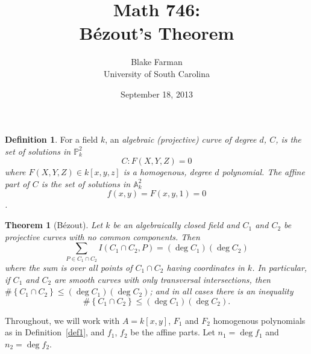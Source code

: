 \documentclass[10pt]{amsart}
\author{Blake Farman\\University of South Carolina}
\title{Math 746:\\B\'{e}zout's Theorem}
\date{September 18, 2013}
\begin{document}
\maketitle

\providecommand{\p}{\mathfrak{p}}
\providecommand{\m}{\mathfrak{m}}

\newtheorem{thm}{Theorem}
\newtheorem{lem}{Lemma}
\newtheorem{prop}{Proposition}
\theoremstyle{definition}
\newtheorem{defn}{Definition}

\newcommand{\A}{\mathbb{A}}

\begin{defn}\label{curve}
  For a field $k$, an \it{algebraic (projective) curve of degree $d$}, $C$, is the set of solutions in $\mathbb{P}^2_k$
  $$C \colon F(X,Y,Z) = 0$$
  where $F(X,Y,Z) \in k[x,y,z]$ is a homogenous, degree $d$ polynomial.
  The \it{affine part} of $C$ is the set of solutions in $\A_k^2$ $$f(x,y) = F(x,y,1) = 0$$.
\end{defn}


\begin{thm}[B\'{e}zout] 
  Let $k$ be an algebraically closed field and $C_1$ and $C_2$ be projective curves with no common components.
  Then 
  $$\sum_{P \in C_1 \cap C_2} I(C_1 \cap C_2, P) = (\deg{C_1})(\deg{C_2})$$
  where the sum is over all points of $C_1 \cap C_2$ having coordinates in $k$.
  In particular, if $C_1$ and $C_2$ are smooth curves with only transversal intersections, then $\#\left\{C_1 \cap C_2\right\} \leq (\deg{C_1})(\deg{C_2})$; and in all cases there is an inequality
  $$\#\left\{C_1 \cap C_2 \right\} \leq (\deg{C_1})(\deg{C_2}).$$
\end{thm}

Throughout, we will work with $A = k[x,y]$, $F_1$ and $F_2$ homogenous polynomials as in Definition~\ref{def1}, and $f_1$, $f_2$ be the affine parts.
Let $n_1 = \deg{f_1}$ and $n_2 = \deg{f_2}$.
\end{document}
